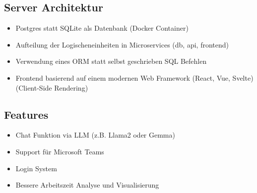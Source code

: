 \documentclass[../main.tex]{subfiles}
\begin{document}
\subsection{Server Architektur}
\begin{itemize}
    \item Postgres statt SQLite als Datenbank (Docker Container)
    \item Aufteilung der Logischeneinheiten in Microservices (db, api, frontend)
    \item Verwendung eines ORM statt selbst geschrieben SQL Befehlen
    \item Frontend basierend auf einem modernen Web Framework (React, Vue, Svelte) (Client-Side Rendering)
\end{itemize}

\subsection{Features}
\begin{itemize}
    \item Chat Funktion via LLM (z.B. Llama2 oder Gemma)
    \item Support für Microsoft Teams
    \item Login System
    \item Bessere Arbeitszeit Analyse und Visualisierung
\end{itemize}
\end{document}
